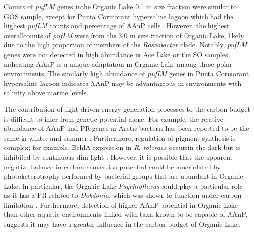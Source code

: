 

Counts of \emph{pufLM} genes inthe Organic Lake 0.1 \textmu{}m size fraction were similar to \ac{GOS} sample, except for Punta Cormorant hypersaline lagoon which had the highest \emph{pufLM} counts and percentage of \ac{AAnP} cells . 
However, the highest overallcounts of \emph{pufLM} were from the 3.0 \textmu{}m size fraction of Organic Lake, likely due to the high proportion of members of the \emph{Roseobacter} clade. 
Notably, \emph{pufLM} genes were not detected in high abundance in Ace Lake or the \ac{SO} samples, indicating \ac{AAnP} is a unique adaptation in Organic Lake among these polar environments. 
The similarly high abundance of \emph{pufLM} genes in Punta Cormorant hypersaline lagoon indicates \ac{AAnP} may be advantageous in environments with salinity above marine levels.

The contribution of light-driven energy generation processes to the carbon budget is difficult to infer from genetic potential alone. 
For example, the relative abundance of \ac{AAnP} and \ac{PR} genes in Arctic bacteria has been reported to be the same in winter and summer \cite{Cottrell2009}. 
Furthermore, regulation of pigment synthesis is complex; for example, \ac{BchlA} expression in \emph{R. tolerans} occursin the dark but is inhibited by continuous dim light \cite{Labrenz1999}. 
However, it is possible that the apparent negative balance in carbon conversion potential could be ameriolated by photoheterotrophy performed by bacterial groups that are abundant in Organic Lake. 
In particular, the Organic Lake \emph{Psychroflexus} could play a particular role as it has a \ac{PR} related to \emph{Dokdonia}, which was shown to function under carbon-limitation \cite{Gomez-Consarnau2007}.
Furthermore, detection of higher \ac{AAnP} potential in Organic Lake than other aquatic environments linked with taxa known to be capable of \ac{AAnP}, suggests it may have a greater influence in the carbon budget of Organic Lake.

